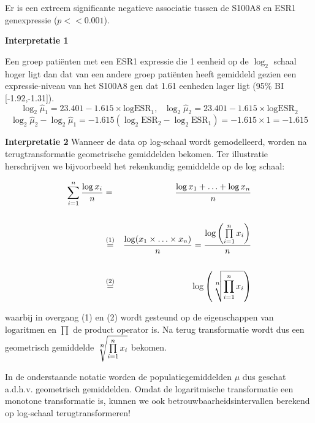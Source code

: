 \documentclass[12pt,dutch,coursenotes]{book}
\newenvironment{Shaded}{\begin{snugshade}}{\end{snugshade}}
\newcommand{\DecValTok}[1]{\textcolor[rgb]{0.00,0.00,0.81}{#1}}
\newcommand{\OperatorTok}[1]{\textcolor[rgb]{0.81,0.36,0.00}{\textbf{#1}}}
\newcommand{\NormalTok}[1]{#1}
\theoremstyle{definition}
\theoremstyle{definition}
\theoremstyle{definition}
\theoremstyle{remark}
\begin{document}
Er is een extreem significante negatieve associatie tussen de S100A8 en
ESR1 genexpressie (\(p<<0.001\)).

\textbf{Interpretatie 1}

Een groep patiënten met een ESR1 expressie die 1 eenheid op de
\(\log_2\) schaal hoger ligt dan dat van een andere groep patiënten
heeft gemiddeld gezien een expressie-niveau van het S100A8 gen dat 1.61
eenheden lager ligt (95\% BI {[}-1.92,-1.31{]}).
\[\log_2 \hat\mu_1=23.401  -1.615 \times \text{logESR}_1,\text{ } \log_2 \hat\mu_2=23.401  -1.615 \times \text{logESR}_2 \]
\[\log_2 \hat\mu_2-\log_2 \hat\mu_1=  -1.615 (\log_2 \text{ESR}_2-\log_2 \text{ESR}_1) = -1.615 \times 1 = -1.615\]

\textbf{Interpretatie 2} Wanneer de data op log-schaal wordt
gemodelleerd, worden na terugtransformatie geometrische gemiddelden
bekomen. Ter illustratie herschrijven we bijvoorbeeld het rekenkundig
gemiddelde op de log schaal:

\begin{eqnarray*}
\sum\limits_{i=1}^n \frac{\log x_i}{n}&=&\frac{\log x_1 + \ldots + \log x_n}{n}\\\\
&\stackrel{(1)}{=}&\frac{\log(x_1 \times \ldots \times x_n)}{n}=\frac{\log\left(\prod\limits_{i=1}^n x_i\right)}{n}\\\\
&\stackrel{(2)}{=}&\log \left(\sqrt[\leftroot{-1}\uproot{2}\scriptstyle n]{\prod\limits_{i=1}^n x_i}\right)
\end{eqnarray*}

waarbij in overgang (1) en (2) wordt gesteund op de eigenschappen van
logaritmen en \(\prod\) de product operator is. Na terug transformatie
wordt dus een geometrisch gemiddelde
\(\sqrt[\leftroot{-1}\uproot{2}\scriptstyle n]{\prod\limits_{i=1}^n x_i}\)
bekomen.

In de onderstaande notatie worden de populatiegemiddelden \(\mu\) dus
geschat a.d.h.v. geometrisch gemiddelden. Omdat de logaritmische
transformatie een monotone transformatie is, kunnen we ook
betrouwbaarheidsintervallen berekend op log-schaal terugtransformeren!

\begin{Shaded}
\end{Shaded}
\end{document}
